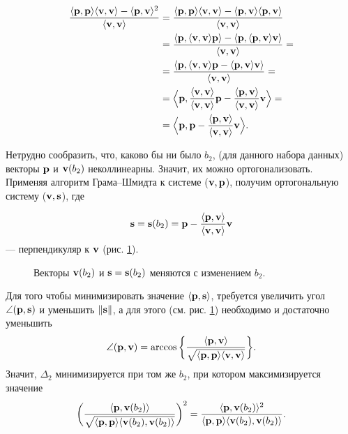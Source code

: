 \[
\begin{split}
\dfrac{\langle \mathbf{p}, \mathbf{p} \rangle\langle \mathbf{v}, \mathbf{v} \rangle - \langle \mathbf{p}, \mathbf{v} \rangle^2}{\langle \mathbf{v}, \mathbf{v} \rangle} & = \dfrac{\langle \mathbf{p}, \mathbf{p} \rangle\langle \mathbf{v}, \mathbf{v} \rangle - \langle \mathbf{p}, \mathbf{v} \rangle \langle \mathbf{p}, \mathbf{v} \rangle}{\langle \mathbf{v}, \mathbf{v} \rangle}\\
& = \dfrac{\langle \mathbf{p}, \langle \mathbf{v}, \mathbf{v} \rangle \mathbf{p} \rangle - \langle \mathbf{p}, \langle \mathbf{p}, \mathbf{v} \rangle \mathbf{v} \rangle}{\langle \mathbf{v}, \mathbf{v} \rangle} =\\
& = \dfrac{\langle \mathbf{p}, \langle \mathbf{v}, \mathbf{v} \rangle \mathbf{p} - \langle \mathbf{p}, \mathbf{v} \rangle \mathbf{v} \rangle}{\langle \mathbf{v}, \mathbf{v} \rangle} =\\
& = \Big \langle \mathbf{p},  \dfrac{\langle \mathbf{v}, \mathbf{v} \rangle}{\langle \mathbf{v}, \mathbf{v} \rangle} \mathbf{p} - \dfrac{\langle \mathbf{p}, \mathbf{v} \rangle}{\langle \mathbf{v}, \mathbf{v} \rangle} \mathbf{v}  \Big \rangle =\\
& = \Big \langle \mathbf{p},  \mathbf{p} - \dfrac{\langle \mathbf{p}, \mathbf{v} \rangle}{\langle \mathbf{v}, \mathbf{v} \rangle} \mathbf{v}  \Big \rangle.
\end{split}
\]

Нетрудно сообразить, что, каково бы ни было $b_2$, (для данного набора данных) векторы $\mathbf{p}$ и $\mathbf{v}(b_2)$ неколлинеарны. Значит, их можно ортогонализовать. Применяя алгоритм Грама--Шмидта к системе ($\mathbf{v}, \mathbf{p}$), получим ортогональную систему ($\mathbf{v}, \mathbf{s}$), где 

\[
\mathbf{s} = \mathbf{s}(b_2) = \mathbf{p} - \dfrac{\langle \mathbf{p}, \mathbf{v} \rangle}{\langle \mathbf{v}, \mathbf{v} \rangle} \mathbf{v}
\]
--- перпендикуляр к $\mathbf{v}$ (рис. \ref{fig:fig-1}).

\begin{figure}[h]
\vspace{5pt}
\centering

\caption{Векторы $\mathbf{v}(b_2)$ и $\mathbf{s}=\mathbf{s}(b_2)$ меняются  с изменением $b_2$.}
\label{fig:fig-1}
\vspace{5pt}
\end{figure}

Для того чтобы минимизировать значение $\langle \mathbf{p}, \mathbf{s} \rangle$, требуется увеличить угол $\angle (\mathbf{p}, \mathbf{s})$ и уменьшить $\lVert \mathbf{s}\rVert$, а для этого (см. рис. \ref{fig:fig-1}) необходимо и достаточно уменьшить
\[
\angle (\mathbf{p}, \mathbf{v}) = \arccos \bigg\{ \dfrac{\langle \mathbf{p}, \mathbf{v} \rangle}{ \sqrt{\langle \mathbf{p}, \mathbf{p} \rangle\langle \mathbf{v}, \mathbf{v} \rangle} } \bigg\}.
\]
Значит, $\Delta _2$ минимизируется при том же $b_2$, при котором максимизируется значение
\[
\bigg( \dfrac{\langle \mathbf{p}, \mathbf{v}(b_2) \rangle}{ \sqrt{\langle \mathbf{p}, \mathbf{p} \rangle\langle \mathbf{v}(b_2), \mathbf{v}(b_2) \rangle} } \bigg)^2 =  \dfrac{\langle \mathbf{p}, \mathbf{v}(b_2) \rangle^2}{ \langle \mathbf{p}, \mathbf{p} \rangle\langle \mathbf{v}(b_2), \mathbf{v}(b_2) \rangle }.
\]

